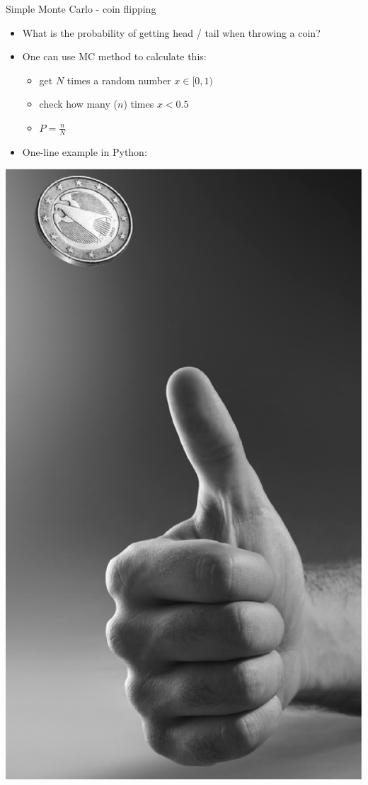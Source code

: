 \begin{wideslide}[toc = Simple Monte Carlo, method=direct]{Simple Monte Carlo - coin flipping}
\null\vfill

  \begin{itemize}
    \item What is the probability of getting head / tail when throwing a coin?
  \end{itemize}
  
  \begin{minipage}{0.7\textwidth}
  \begin{itemize}
    \item One can use MC method to calculate this:
    \begin{itemize}
      \item get $N$ times a random number $x \in [0,1)$
      \item check how many ($n$) times $x < 0.5$
      \item $P = \frac{n}{N}$
    \end{itemize}
    \item One-line example in Python:
  \end{itemize}
  \end{minipage}\begin{minipage}{0.3\textwidth}
		  \includegraphics[width=0.5\columnwidth]{figures/coin.eps}
                \end{minipage}


\end{wideslide}
